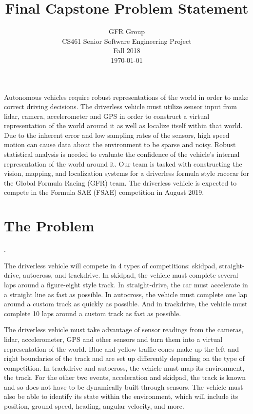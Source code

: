 \documentclass[10pt, onecolumn, draftclsnofoot, letterpaper,compsoc]{IEEEtran}
\title{Final Capstone Problem Statement}
\author{GFR Group \\
            CS461 Senior Software Engineering Project \\
            Fall 2018 \\
            \today}
\begin{document}

\maketitle

Autonomous vehicles require robust representations of the world in order to make correct driving decisions. The driverless vehicle must utilize sensor input from lidar, camera, accelerometer and GPS in order to construct a virtual representation of the world around it as well as localize itself within that world. Due to the inherent error and low sampling rates of the sensors, high speed motion can cause data about the environment to be sparse and noisy. Robust statistical analysis is needed to evaluate the confidence of the vehicle's internal representation of the world around it. Our team is tasked with constructing the vision, mapping, and localization systems for a driverless formula style racecar for the Global Formula Racing (GFR) team. The driverless vehicle is expected to compete in the Formula SAE (FSAE) competition in August 2019. 


\newpage
\tableofcontents

\newpage


\section{The Problem}.

The driverless vehicle will compete in 4 types of competitions: skidpad, straight-drive, autocross, and trackdrive. In skidpad, the vehicle must complete several laps around a figure-eight style track. In straight-drive, the car must accelerate in a straight line as fast as possible. In autocross, the vehicle must complete one lap around a custom track as quickly as possible. And in trackdrive, the vehicle must complete 10 laps around a custom track as fast as possible. 

The driverless vehicle must take advantage of sensor readings from the cameras, lidar, accelerometer, GPS and other sensors and turn them into a virtual representation of the world. Blue and yellow traffic cones make up the left and right boundaries of the track and are set up differently depending on the type of competition. In trackdrive and autocross, the vehicle must map its environment, the track. For the other two events, acceleration and skidpad, the track is known and so does not have to be dynamically built through sensors. The vehicle must also be able to identify its state within the environment, which will include its position, ground speed, heading, angular velocity, and more.
\end{document}
